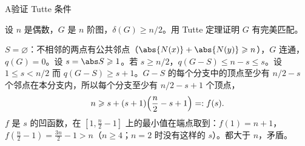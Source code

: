 \begin{exercises}{A}{验证 Tutte 条件}
\item\label{ex:tutte-condition:A4} 设 $n$ 是偶数，$G$ 是 $n$ 阶图，$\delta(G)\geqslant n/2$。用 Tutte 定理证明 $G$ 有完美匹配。
\begin{solution}
$S=\varnothing$：不相邻的两点有公共邻点（$\abs{N(x)}+\abs{N(y)}\geqslant n$），$G$ 连通，$q(G)=0$。设 $s=\abs S\geqslant1$。若 $s\geqslant n/2$，$q(G-S)\leqslant n-s\leqslant s$。设 $1\leqslant s<n/2$ 而 $q(G-S)\geqslant s+1$。$G-S$ 的每个分支中的顶点至少有 $n/2-s$ 个邻点在本分支内，所以每个分支至少有 $n/2-s+1$ 个顶点，
\[
n\geqslant s+(s+1)\Bigl(\frac n2-s+1\Bigr)=:f(s).
\]
$f$ 是 $s$ 的凹函数，在 $[1,\frac n2-1]$ 上的最小值在端点取到：$f(1)=n+1$，$f(\frac n2-1)=\frac{3n}2-1>n$（$n\geqslant4$；$n=2$ 时没有这样的 $s$）。都大于 $n$，矛盾。
\end{solution}
\end{exercises}
